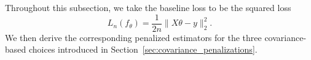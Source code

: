 \documentclass[12pt, draft]{article}
\theoremstyle{plain}
\theoremstyle{definition}
\newcommand{\1}{\mathbf{1}}
\newcommand{\Cov}{\text{Cov}}
\begin{document}
{Throughout this subsection, we take the baseline loss to be the squared loss
\[
L_n(f_\theta) = \frac{1}{2n}\|X\theta-y\|_2^2.
\]
We then derive the corresponding penalized estimators for the three covariance-based choices introduced in Section~\ref{sec:covariance_penalizations}.




}
\end{document}
